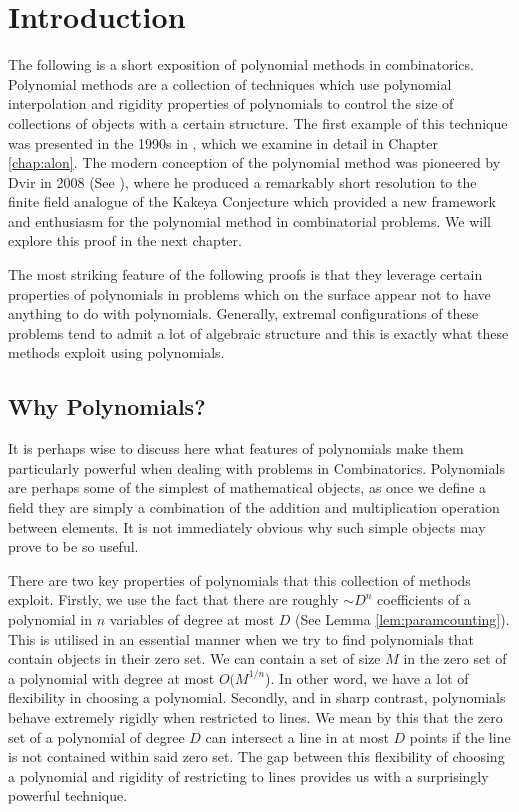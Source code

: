 \chapter{Introduction}
The following is a short exposition of polynomial methods in combinatorics. Polynomial methods are a collection of techniques which use polynomial interpolation and rigidity properties
of polynomials to control the size of collections of objects with a certain structure. 
The first example of this technique was presented in the 1990s in \cite{alon1999combinatorial},  which we examine in detail
in Chapter \ref{chap:alon}. The modern conception of the polynomial method was pioneered by Dvir in 2008 (See \cite{2008DVIR}), where he produced a remarkably short resolution to the finite field analogue of the Kakeya Conjecture which provided
a new framework and enthusiasm for the polynomial method in combinatorial problems. We will explore this proof in the next chapter. 

The most striking feature of the following proofs is that they leverage certain properties of polynomials in problems which on the surface appear not to have anything to 
do with polynomials. Generally, extremal configurations of these problems tend to admit a lot of algebraic structure and this is exactly what these methods exploit using polynomials. 


\section{Why Polynomials?}
It is perhaps wise to discuss here what features of polynomials make them particularly powerful when dealing with problems in Combinatorics. 
Polynomials are perhaps some of the simplest of mathematical objects, as once we define a field they are simply a combination of the addition and multiplication operation between elements. 
It is not immediately obvious why such simple objects may prove to be so useful.

There are two key properties of polynomials that this collection of methods exploit.
Firstly, we use the fact that there are roughly $\sim D^n$ coefficients of a polynomial in $n$ variables of degree at most $D$ (See Lemma \ref{lem:paramcounting}).  This is utilised 
in an essential manner when we try to find polynomials that contain objects in their zero set. We can contain a set of size $M$ in the zero set of
a polynomial with degree at most $O(M^{1/n}$). In other word, we have a lot of flexibility in choosing a polynomial.
Secondly, and in sharp contrast, polynomials behave extremely rigidly when restricted to lines. We mean by this that the zero set of a polynomial of degree $D$ can intersect 
a line in at most $D$ points if the line is not contained within said zero set. The gap between this flexibility of choosing a polynomial and rigidity of restricting to lines provides
us with a surprisingly powerful technique. 

